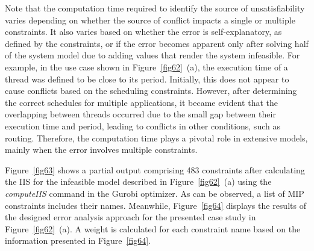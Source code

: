     Note that the computation time required to identify the source of unsatisfiability varies depending on whether the source of conflict impacts a single or multiple constraints. It also varies based on whether the error is self-explanatory, as defined by the constraints, or if the error becomes apparent only after solving half of the system model due to adding values that render the system infeasible.
    For example, in the use case shown in Figure~\ref{fig62}~(a), the execution time of a thread was defined to be close to its period. Initially, this does not appear to cause conflicts based on the scheduling constraints. However, after determining the correct schedules for multiple applications, it became evident that the overlapping between threads occurred due to the small gap between their execution time and period, leading to conflicts in other conditions, such as routing. Therefore, the computation time plays a pivotal role in extensive models, mainly when the error involves multiple constraints.
    
    
    
    
    Figure~\ref{fig63} shows a partial output comprising 483 constraints after calculating the IIS for the infeasible model described in Figure~\ref{fig62}~(a) using the \textit{computeIIS} command in the Gurobi optimizer. As can be observed, a list of MIP constraints includes their names. Meanwhile, Figure~\ref{fig64} displays the results of the designed error analysis approach for the presented case study in Figure~\ref{fig62}~(a). A weight is calculated for each constraint name based on the information presented in Figure~\ref{fig64}.
        
